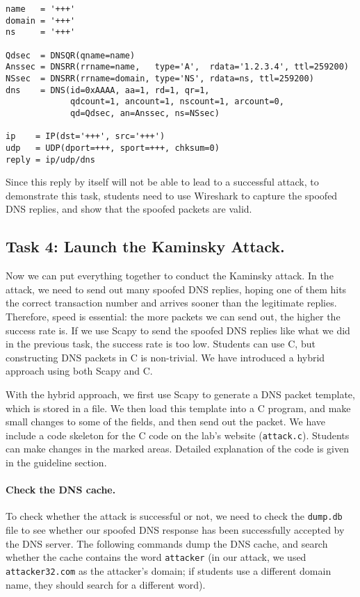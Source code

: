 \begin{lstlisting}
name   = '+++'  
domain = '+++'  
ns     = '+++'

Qdsec  = DNSQR(qname=name)
Anssec = DNSRR(rrname=name,   type='A',  rdata='1.2.3.4', ttl=259200)
NSsec  = DNSRR(rrname=domain, type='NS', rdata=ns, ttl=259200)
dns    = DNS(id=0xAAAA, aa=1, rd=1, qr=1,
             qdcount=1, ancount=1, nscount=1, arcount=0,
             qd=Qdsec, an=Anssec, ns=NSsec)

ip    = IP(dst='+++', src='+++')
udp   = UDP(dport=+++, sport=+++, chksum=0)
reply = ip/udp/dns
\end{lstlisting}
 

Since this reply by itself will not be able to lead to a successful 
attack, to demonstrate this task, students need to 
use Wireshark to capture the spoofed DNS replies, and 
show that the spoofed packets are valid. 


\subsection{Task 4: Launch the Kaminsky Attack.}   

Now we can put everything together to conduct the Kaminsky attack. 
In the attack, we need to send out many spoofed DNS replies, hoping 
one of them hits the correct transaction number and arrives sooner
than the legitimate replies. Therefore, speed is essential: the more packets 
we can send out, the higher the success rate is. If we use 
Scapy to send the spoofed DNS replies like what we did in the 
previous task, the success rate is too low. Students can use 
C, but constructing DNS packets in C is non-trivial. 
We have introduced a hybrid approach using both Scapy and C. 


With the hybrid approach, we first use Scapy to generate 
a DNS packet template, which is stored in a file. 
We then load this template into a C program, and make 
small changes to some of the fields, and then send 
out the packet. 
We have include a code skeleton for the C code
on the lab's website (\texttt{attack.c}). 
Students can make changes
in the marked areas. Detailed explanation
of the code is given in the 
guideline section.


\paragraph{Check the DNS cache.}
To check whether the attack is successful or not, we need to 
check the {\tt dump.db} file to see whether our spoofed DNS
response has been successfully accepted by the DNS server. 
The following commands dump the DNS cache, and search whether
the cache contains the word \texttt{attacker} (in our 
attack, we used \texttt{attacker32.com} as the attacker's 
domain; if students use a different domain name, they should 
search for a different word).  

